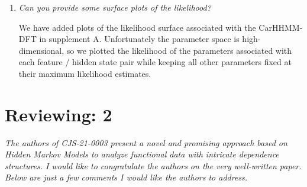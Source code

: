 \documentclass{article}
\begin{document}
\begin{enumerate}
\begin{enumerate}
        \item \textit{Can you provide some surface plots of the likelihood?} 
        
        We have added plots of the likelihood surface associated with the CarHHMM-DFT in supplement A. Unfortunately the parameter space is high-dimensional, so we plotted the likelihood of the parameters associated with each feature / hidden state pair while keeping all other parameters fixed at their maximum likelihood estimates.
        
    \end{enumerate}

\end{enumerate}


\section{Reviewing: 2}

\textit{The authors of CJS-21-0003 present a novel and promising approach based on Hidden Markov Models to analyze functional data with intricate dependence structures. I would like to congratulate the authors on the very well-written paper. Below are just a few comments I would like the authors to address.}
\end{document}
